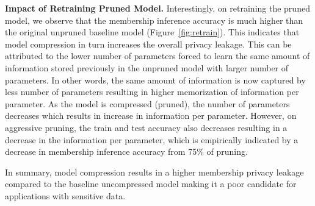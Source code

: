 \textbf{Impact of Retraining Pruned Model.} Interestingly, on retraining the pruned model, we observe that the membership inference accuracy is much higher than the original unpruned baseline model (Figure~\ref{fig:retrain}).
This indicates that model compression in turn increases the overall privacy leakage.
This can be attributed to the lower number of parameters forced to learn the same amount of information stored previously in the unpruned model with larger number of parameters.
In other words, the same amount of information is now captured by less number of parameters resulting in higher memorization of information per parameter.
As the model is compressed (pruned), the number of parameters decreases which results in increase in information per parameter. However, on aggressive pruning, the train and test accuracy also decreases resulting in a decrease in the information per parameter, which is empirically indicated by a decrease in membership inference accuracy from 75\% of pruning.



In summary, model compression results in a higher membership privacy leakage compared to the baseline uncompressed model making it a poor candidate for applications with sensitive data.

